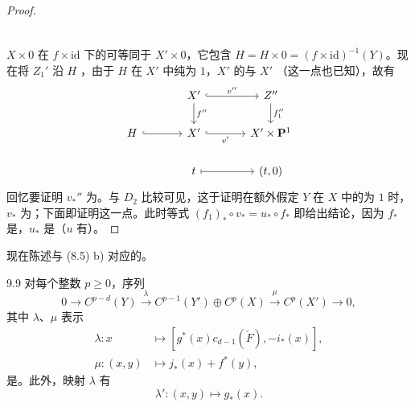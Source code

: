 \begin{proof}
\[\begin{tikzcd}[column sep=large]
\end{tikzcd}
\]
$X\times0$ 在 $f\times\mathrm{id}$ 下的可等同于 $X'\times0$，它包含 $H=H\times0=(f\times\mathrm{id})^{-1}(Y)$。现在将 $Z_1'$ 沿 $H$ ，由于 $H$ 在 $X'$ 中纯为 $1$，$X'$ 的与 $X'$ （这一点也已知），故有
\[
\begin{tikzcd}[column sep=large]
 &X'\arrow[r,hook,"v''"]\arrow[d,"f''"]&Z''\arrow[d,"f_1''"]\\
 H\arrow[r,hook]&X'\arrow[r,hook,"v'"']&X'\times\mathbf P^1\\
 &t\arrow[r,mapsto]&(t,0)
\end{tikzcd}
\]
回忆要证明 $v_*''$ 为。与 $D_2$ 比较可见，这于证明在额外假定 $Y$ 在 $X$ 中的为 $1$ 时，$v_*$ 为；下面即证明这一点。此时等式 $(f_1)_*\circ v_*=u_*\circ f_*$ 即给出结论，因为 $f_*$ 是，$u_*$ 是（$u$ 有）。
\end{proof}
现在陈述与 (8.5) b) 对应的。
\begin{SGAresult}{}{9.9}
对每个整数 $p\ge0$，序列
\[
 0\longrightarrow C^{p-d}(Y)\xrightarrow{\lambda}C^{p-1}(Y')\oplus C^p(X)
 \xrightarrow{\mu}C^p(X')\longrightarrow0,
\]
其中 $\lambda$、$\mu$ 表示
\[
 \begin{aligned}
 \lambda:x&\longmapsto[g^*(x)c_{d-1}(\check F),-i_*(x)],\\
 \mu:(x,y)&\longmapsto j_*(x)+f^*(y),
 \end{aligned}
\]
是。此外，映射 $\lambda$ 有
\[
 \lambda':(x,y)\longmapsto g_*(x).
\]
\end{SGAresult}
